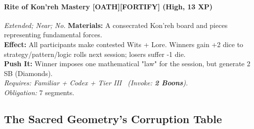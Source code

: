 \paragraph{Rite of Kon'reh Mastery \textnormal{[OATH][FORTIFY]} (High, 13 XP)} \emph{Extended; Near; No.}
\textbf{Materials:} A consecrated Kon'reh board and pieces representing fundamental forces.\\
\textbf{Effect:} All participants make contested Wits + Lore. Winners gain +2 dice to strategy/pattern/logic rolls next session; losers suffer -1 die.\\
\textbf{Push It:} Winner imposes one mathematical "law" for the session, but generate 2 SB (Diamonds).\\
\emph{Requires: Familiar + Codex + Tier III \ (\textit{Invoke:} \textbf{2 Boons}).}\\
\emph{Obligation:} 7 segments.

\subsection*{The Sacred Geometry's Corruption Table}
\label{sec:sacred-geometry-corruption}

